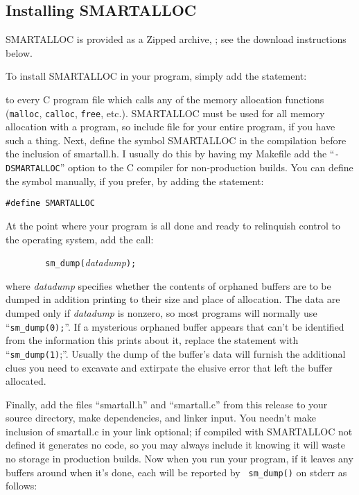 \subsection{ Installing SMARTALLOC}

SMARTALLOC is provided as a Zipped archive, 
; see the
download instructions below. 

To install SMARTALLOC in your program, simply add the statement: 

to every C program file which calls any of the memory allocation functions
({\tt malloc}, {\tt calloc}, {\tt free}, etc.). SMARTALLOC must be used for
all memory allocation with a program, so include file for your entire program,
if you have such a thing. Next, define the symbol SMARTALLOC in the
compilation before the inclusion of smartall.h. I usually do this by having my
Makefile add the ``{\tt -DSMARTALLOC}'' option to the C compiler for
non-production builds. You can define the symbol manually, if you prefer, by
adding the statement: 

{\tt \#define SMARTALLOC} 

At the point where your program is all done and ready to relinquish control to
the operating system, add the call: 

{\tt \ \ \ \ \ \ \ \ sm\_dump(}{\it datadump}{\tt );} 

where {\it datadump} specifies whether the contents of orphaned buffers are to
be dumped in addition printing to their size and place of allocation. The data
are dumped only if {\it datadump} is nonzero, so most programs will normally
use ``{\tt sm\_dump(0);}''. If a mysterious orphaned buffer appears that can't
be identified from the information this prints about it, replace the statement
with ``{\tt sm\_dump(1)};''. Usually the dump of the buffer's data will
furnish the additional clues you need to excavate and extirpate the elusive
error that left the buffer allocated. 

Finally, add the files ``smartall.h'' and ``smartall.c'' from this release to
your source directory, make dependencies, and linker input. You needn't make
inclusion of smartall.c in your link optional; if compiled with SMARTALLOC not
defined it generates no code, so you may always include it knowing it will
waste no storage in production builds. Now when you run your program, if it
leaves any buffers around when it's done, each will be reported by {\tt
sm\_dump()} on stderr as follows: 

